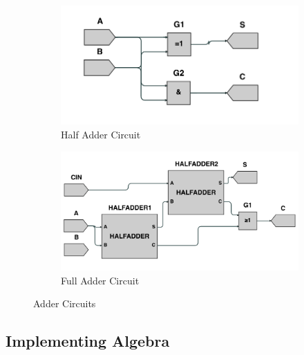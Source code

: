 \begin{figure}
     \centering
     \begin{subfigure}[b]{0.45\textwidth}
         \centering
         \includegraphics[width=\textwidth]{05.ImpPlan/halfadd.png}
         \caption{Half Adder Circuit}
         \label{fig:halfadd}
     \end{subfigure}
     \begin{subfigure}[b]{0.45\textwidth}
         \centering
         \includegraphics[width=\textwidth]{05.ImpPlan/fulladd.png}
         \caption{Full Adder Circuit}
         \label{fig:fulladd}
     \end{subfigure}
        \caption{Adder Circuits}
        \label{fig:adders}
\end{figure}

\subsection{Implementing Algebra}

